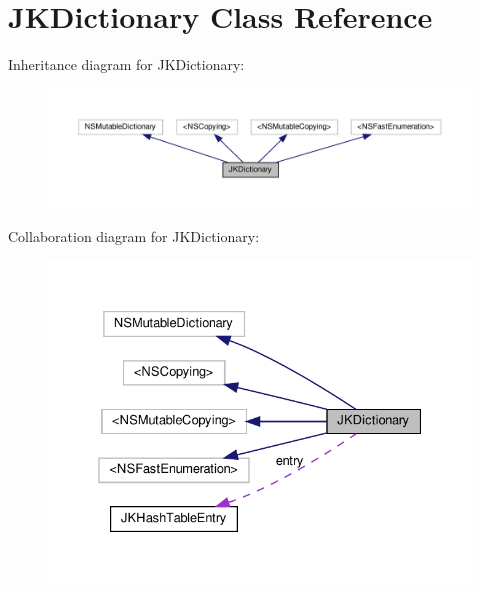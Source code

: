 \hypertarget{interfaceJKDictionary}{}\section{J\+K\+Dictionary Class Reference}
\label{interfaceJKDictionary}


Inheritance diagram for J\+K\+Dictionary\+:
\nopagebreak
\begin{figure}[H]
\begin{center}
\leavevmode
\includegraphics[width=350pt]{interfaceJKDictionary__inherit__graph}
\end{center}
\end{figure}


Collaboration diagram for J\+K\+Dictionary\+:
\nopagebreak
\begin{figure}[H]
\begin{center}
\leavevmode
\includegraphics[width=331pt]{interfaceJKDictionary__coll__graph}
\end{center}
\end{figure}
